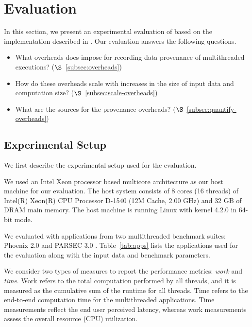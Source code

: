 \section{Evaluation}
\label{sec:evaluation}

In this section, we present an experimental evaluation of \projecttitle based on the implementation described in  . Our evaluation answers the following questions.

\begin{itemize}
\item What overheads does \projecttitle impose for recording data provenance of multithreaded executions? ($\S$~\ref{subsec:overheads})
\item How do these overheads scale with increases in the size of input data and computation size? ($\S$~\ref{subsec:scale-overheads})
\item What are the sources for the provenance overheads? ($\S$~\ref{subsec:quantify-overheads})
\end{itemize}



\subsection{Experimental Setup}
We first describe the experimental setup used for the evaluation.

 We used an Intel Xeon processor based
multicore architecture as our host machine for our evaluation. The
host system consists of 8 cores (16 threads) of Intel(R) Xeon(R) CPU Processor D-1540
(12M Cache, 2.00 GHz) and 32 GB of DRAM main memory. The host
machine is running Linux with kernel 4.2.0 in 64-bit mode.


  We evaluated \projecttitle with applications from two multithreaded benchmark suites: Phoenix 2.0 \cite{phoenix} and PARSEC 3.0 \cite{parsec}. Table~\ref{tab:apps} lists the applications used for the evaluation along with the input data and benchmark parameters.  





  We consider two types of measures to report the performance metrics: {\em work} and {\em time}. Work refers to the total computation performed by all threads, and it is measured as the cumulative sum of the runtime for all threads. Time refers to the end-to-end computation time for the multithreaded applications. Time measurements reflect the end user perceived latency, whereas work measurements assess the overall resource (CPU) utilization.


